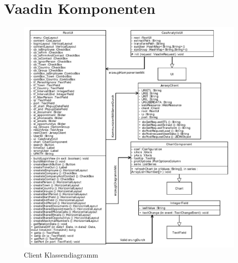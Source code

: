 \section{Vaadin Komponenten}

\begin{figure}[htbp]
\begin{center}
\includegraphics[width=1.0\textwidth]{pics/ClientKlassendiagramm.pdf}
\caption{Client Klassendiagramm}
\label{umsetzung_klassendiagramm_client}
\end{center}
\end{figure}